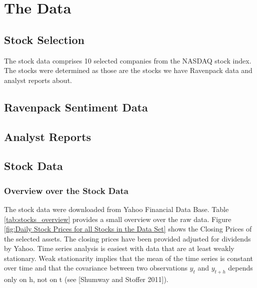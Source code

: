 \chapter{The Data}

\section{Stock Selection}
The stock data comprises 10 selected companies from the NASDAQ stock index. The stocks were determined as those are the stocks we have Ravenpack data and analyst reports about. 


\section{Ravenpack Sentiment Data}


\section{Analyst Reports}


\section{Stock Data}
\subsection{Overview over the Stock Data}
The stock data were downloaded from Yahoo Financial Data Base. Table \ref{tab:stocks_overview} provides a small overview over the raw data. Figure \ref{fig:Daily Stock Prices for all Stocks in the Data Set} shows the Closing Prices of the selected assets. The closing prices have been provided adjusted for dividends by Yahoo. Time series analysis is easiest with data that are at least weakly stationary. Weak stationarity implies that the mean of the time series is constant over time and that the covariance between two observations $y_t$ and $y_{t+h}$ depends only on h, not on t (see [Shumway and Stoffer 2011]). 

\begin{table}[]
    \centering
    \begin{adjustbox}{width = 0.9\linewidth}
    \setlength{\tabcolsep}{15pt}
    
    \end{adjustbox}
    \caption{}
    \label{tab:stocks_overview}
\end{table}{}

